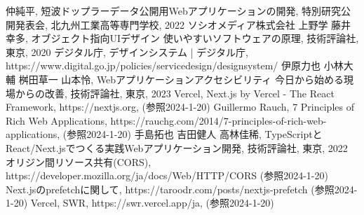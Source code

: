 \begin{thebibliography}{99}
	仲純平, 短波ドップラーデータ公開用Webアプリケーションの開発, 特別研究公開発表会, 北九州工業高等専門学校, 2022
	ソシオメディア株式会社 上野学 藤井幸多, オブジェクト指向UIデザイン 使いやすいソフトウェアの原理, 技術評論社, 東京, 2020
	デジタル庁, デザインシステム | デジタル庁, https://www.digital.go.jp/policies/servicedesign/designsystem/
	伊原力也 小林大輔 桝田草一 山本怜, Webアプリケーションアクセシビリティ 今日から始める現場からの改善, 技術評論社, 東京, 2023
	Vercel, Next.js by Vercel - The React Framework, https://nextjs.org, (参照2024-1-20)
	Guillermo Rauch, 7 Principles of Rich Web Applications, https://rauchg.com/2014/7-principles-of-rich-web-applications, (参照2024-1-20)
	手島拓也 吉田健人 高林佳稀, TypeScriptとReact/Next.jsでつくる実践Webアプリケーション開発, 技術評論社, 東京, 2022
	オリジン間リソース共有(CORS), https://developer.mozilla.org/ja/docs/Web/HTTP/CORS (参照2024-1-20)
	Next.jsのprefetchに関して, https://taroodr.com/posts/nextjs-prefetch (参照2024-1-20)
	Vercel, SWR, https://swr.vercel.app/ja, (参照2024-1-20)
\end{thebibliography}